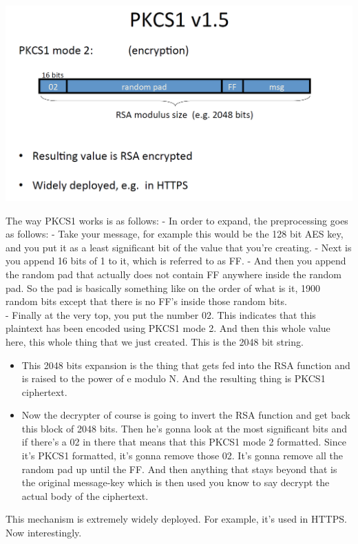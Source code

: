 \documentclass[11pt]{article}
\makeatletter
\def\maxwidth{\ifdim\Gin@nat@width>\linewidth\linewidth
    \else\Gin@nat@width\fi}
\let\Oldincludegraphics\includegraphics
\renewcommand{\includegraphics}[1]{\Oldincludegraphics[width=.8\maxwidth]{#1}}
\makeatother
\begin{document}
\includegraphics{./Images/PKCS1-v1.5.png}

The way PKCS1 works is as follows: - In order to expand, the
preprocessing goes as follows: - Take your message, for example this
would be the 128 bit AES key, and you put it as a least significant bit
of the value that you're creating. - Next is you append 16 bits of 1 to
it, which is referred to as FF. - And then you append the random pad
that actually does not contain FF anywhere inside the random pad. So the
pad is basically something like on the order of what is it, 1900 random
bits except that there is no FF's inside those random bits. \\
- Finally at the very top, you put the number 02. This indicates that
this plaintext has been encoded using PKCS1 mode 2. And then this whole
value here, this whole thing that we just created. This is the 2048 bit
string.

\begin{itemize}
\item
  This 2048 bits expansion is the thing that gets fed into the RSA
  function and is raised to the power of e modulo N. And the resulting
  thing is PKCS1 ciphertext. 
\item
  Now the decrypter of course is going to invert the RSA function and
  get back this block of 2048 bits. Then he's gonna look at the most
  significant bits and if there's a 02 in there that means that this
  PKCS1 mode 2 formatted. Since it's PKCS1 formatted, it's gonna remove
  those 02. It's gonna remove all the random pad up until the FF. And
  then anything that stays beyond that is the original message-key which
  is then used you know to say decrypt the actual body of the
  ciphertext.
\end{itemize}

This mechanism is extremely widely deployed. For example, it's used in
HTTPS. Now interestingly.
\end{document}
